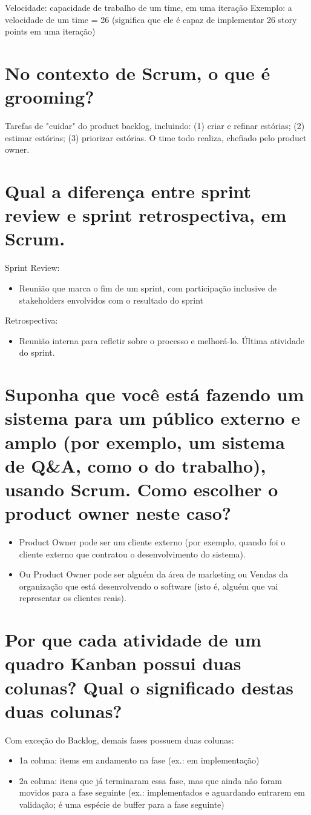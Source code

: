 \documentclass[11pt]{article}
\begin{document}
Velocidade: capacidade de trabalho de um time, em uma iteração Exemplo: a velocidade de
um time = 26 (significa que ele é capaz de implementar 26 story points em uma iteração)


\section{No contexto de Scrum, o que é grooming?}
\label{sec:orgae94e98}
Tarefas de "cuidar" do product backlog, incluindo: (1) criar e refinar estórias; (2)
estimar estórias; (3) priorizar estórias. O time todo realiza, chefiado pelo product
owner.

\section{Qual a diferença entre sprint review e sprint retrospectiva, em Scrum.}
\label{sec:org731c98b}
Sprint Review:
\begin{itemize}
\item Reunião que marca o fim de um sprint, com participação inclusive de stakeholders
envolvidos com o resultado do sprint
\end{itemize}
Retrospectiva:
\begin{itemize}
\item Reunião interna para refletir sobre o processo e melhorá-lo. Última atividade do
sprint.
\end{itemize}

\section{Suponha que você está fazendo um sistema para um público externo e amplo (por exemplo, um sistema de Q\&A, como o do trabalho), usando Scrum. Como escolher o product owner neste caso?}
\label{sec:org2280250}
\begin{itemize}
\item Product Owner pode ser um cliente externo (por exemplo, quando foi o cliente externo que
contratou o desenvolvimento do sistema).
\item Ou Product Owner pode ser alguém da área de marketing ou Vendas da organização que
está desenvolvendo o software (isto é, alguém que vai representar os clientes reais).
\end{itemize}

\section{Por que cada atividade de um quadro Kanban possui duas colunas? Qual o significado destas duas colunas?}
\label{sec:org4ed07fd}
Com exceção do Backlog, demais fases possuem duas colunas:
\begin{itemize}
\item 1a coluna: items em andamento na fase (ex.: em implementação)
\item 2a coluna: itens que já terminaram essa fase, mas que
ainda não foram movidos para a fase seguinte (ex.: implementados e aguardando entrarem
em validação; é uma espécie de buffer para a fase seguinte)
\end{itemize}
\end{document}
